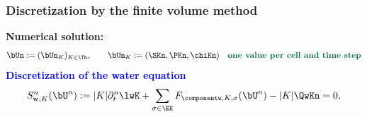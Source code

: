 
\begin{frame}
\frametitle{Discretization by the finite volume method}
\textcolor{cadmiumgreen}{\textbf{Numerical solution: }}
\begin{equation*}
 \bUn \egaldef (\bUn_K)_{K\in \Th}, \qquad \bUn_K \egaldef  (\SKn,\PKn,\chiKn) \quad \textcolor{cadmiumgreen}{\textbf{one value per cell and time step}} 
\end{equation*}
\textcolor{blue}{\textbf{Discretization of the water equation}}
\begin{equation*}
S_{\mathrm{w},K}^n(\bU^n) \egaldef |K| \partial_t^n \lwK  + \sum_{\sigma \in \EK} {F}_{\componentw,K,\sigma}(\bU^{n})- |K|\QwKn = 0,
\end{equation*}
\end{frame}
